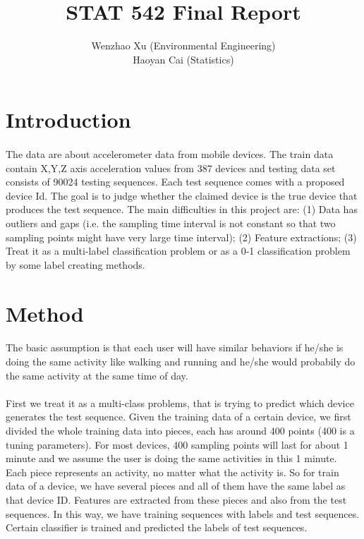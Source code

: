 \documentclass{article}
\author{Wenzhao Xu (Environmental Engineering)\\ Haoyan Cai (Statistics)}
\title{STAT 542 Final Report}
\begin{document}
	\maketitle
	
	\section{Introduction} %
	\label{sec:introduction}
	\paragraph{} The data are about accelerometer data from mobile devices. The train data contain X,Y,Z axis acceleration values from 387 devices and testing data set consists of 90024 testing sequences. Each test sequence comes with a proposed device Id. The goal is to judge whether the claimed device is the true device that produces the test sequence. The main difficulties in this project are: (1) Data has outliers and gaps (i.e. the sampling time interval is not constant so that two sampling points might have very large time interval); (2) Feature extractions; (3) Treat it as a multi-label classification problem or as a 0-1 classification problem by some label creating methods. 
	
	
	\section{Method} %
	\label{sec:method}
	\paragraph{} The basic assumption is that each user will have similar behaviors if he/she is doing the same activity like walking and running and he/she would probabily do the same activity at the same time of day. 
	\paragraph{}First we treat it as a multi-class problems, that is trying to predict which device generates the test sequence. Given the training data of a certain device, we first divided the whole training data into pieces, each has around 400 points (400 is a tuning parameters). For most devices, 400 sampling points will last for about 1 minute and we assume the user is doing the same activities in this 1 minute. Each piece represents an activity, no matter what the activity is. So for train data of a device, we have several pieces and all of them have the same label as that device ID. Features are extracted from these pieces and also from the test sequences. In this way, we have training sequences with labels and test sequences. Certain classifier is trained and predicted the labels of test sequences.
\end{document}
